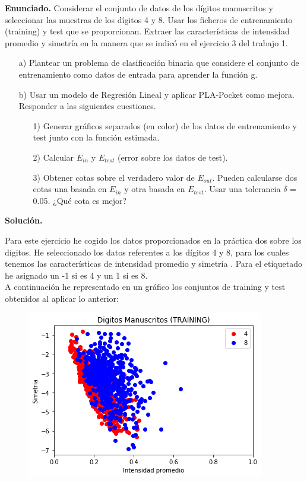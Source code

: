 \documentclass[a4paper,11pt]{article}
\begin{document}
\textbf{Enunciado.} Considerar el conjunto de datos de los dígitos manuscritos y seleccionar las muestras de los dígitos 4 y 8. Usar los ficheros de entrenamiento
(training) y test que se proporcionan. Extraer las características de intensidad promedio y simetría en la manera que se indicó en el ejercicio 3 del trabajo 1.

\begin{itemize}
\item[a)] Plantear un problema de clasificación binaria que considere el conjunto de entrenamiento como datos de entrada para aprender la función g.
\item[b)] Usar un modelo de Regresión Lineal y aplicar PLA-Pocket como mejora. Responder a las siguientes cuestiones.

\begin{itemize}
\item[1)] Generar gráficos separados (en color) de los datos de entrenamiento y test junto con la función estimada.
\item[2)] Calcular $E_{in}$ y $E_{test}$ (error sobre los datos de test).
\item[3)] Obtener cotas sobre el verdadero valor de $E_{out}$. Pueden calcularse dos cotas una
basada en $E_{in}$ y otra basada en $E_{test}$. Usar una tolerancia $\delta$ = 0.05. ¿Qué cota es mejor?
\end{itemize}

\end{itemize}


\textbf{Solución.}

Para este ejercicio he cogido los datos proporcionados en la práctica dos sobre los dígitos. He seleccionado los datos referentes a los dígitos 4 y 8, para los cuales tenemos las características de intensidad promedio y simetría . Para el etiquetado he asignado un -1 si es 4 y un 1 si es 8.\\

A continuación he representado en un gráfico los conjuntos de training y test obtenidos al aplicar lo anterior:

\newpage

\begin{figure}[h]
\includegraphics[scale=0.7]{ej3a1}
\centering
\end{figure}
\end{document}
